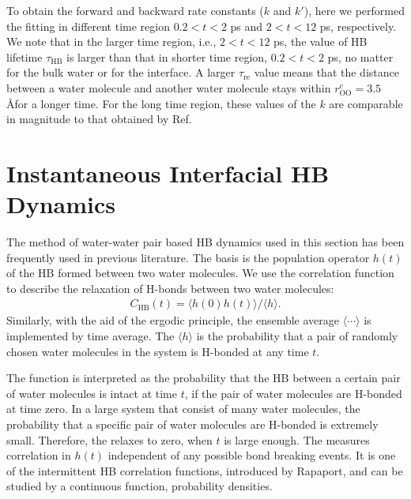 {To obtain the forward and backward rate constants ($k$ and $k'$),
here we performed the fitting in different time region $0.2 < t < 2$ ps and $2 < t < 12$ ps, respectively.
We note that in the larger time region, i.e., $2 < t < 12$ ps, the value of HB lifetime $\tau_\text{HB}$ is larger than that in shorter time region, $0.2 < t < 2$ ps,
no matter for the bulk water or for the interface. A larger $\tau_\text{re}$ value means that the distance between a water molecule and another water molecule 
stays within $r_\text{OO}^c= 3.5$ \AA for a longer time. 
For the long time region, these values of the $k$ are comparable in magnitude to that obtained by Ref. 


\section{Instantaneous Interfacial HB Dynamics}
The method of water-water pair based HB dynamics used in this section has been frequently used in previous literature.\cite{Luzar1994,AL96,AC00} 
The basis is the population operator $h(t)$ of the HB formed between two water molecules. 
We use the correlation function \CHB to describe the relaxation of H-bonds between two water molecules: 
\begin{eqnarray}
C_{\text{HB}}(t)=\langle h(0)h(t) \rangle/\langle h\rangle
\label{eq:C_HB}.
\end{eqnarray}
Similarly, with the aid of the ergodic principle, the ensemble average $\langle \cdots\rangle$ is implemented by time average.
The $\langle h\rangle$ is the probability that a pair of randomly chosen water molecules in the system is
H-bonded at any time $t$. 

The function \CHB is interpreted as the probability that the HB between a certain pair of water molecules is intact at time  $t$, 
if the pair of water molecules are H-bonded at time zero. 
In a large system that consist of many water molecules, the probability that a specific pair of water molecules are H-bonded is extremely small. 
Therefore, the \CHB relaxes to zero, when $t$ is large enough. 
The \CHB measures correlation in $h(t)$ independent of any possible bond breaking events. 
It is one of the intermittent HB correlation functions, introduced by Rapaport, \cite{Rapaport1983} 
and can be studied by a continuous function, probability densities.

}
